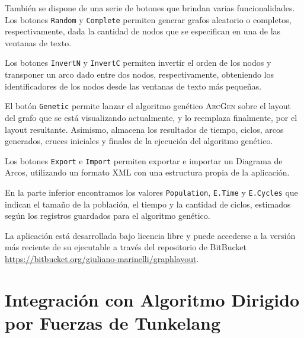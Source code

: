 	
	
	También se dispone de una serie de botones que brindan varias funcionalidades. Los botones \texttt{Random} y \texttt{Complete} permiten generar grafos aleatorio o completos, respectivamente, dada la cantidad de nodos que se especifican en una de las ventanas de texto. 
	
	Los botones \texttt{InvertN} y \texttt{InvertC} permiten invertir el orden de los nodos y transponer un arco dado entre dos nodos, respectivamente, obteniendo los identificadores de los nodos desde las ventanas de texto más pequeñas. 
	
	
	El botón \texttt{Genetic} permite lanzar el algoritmo genético \textsc{\textsc{ArcGen}} sobre el layout del grafo que se está visualizando actualmente, y lo reemplaza finalmente, por el layout resultante. Asimismo,  almacena los resultados de tiempo, ciclos, arcos generados, cruces iniciales y finales de la ejecución del algoritmo genético.
	
	Los botones \texttt{Export} e \texttt{Import} permiten exportar e importar un Diagrama de Arcos, utilizando un formato XML con una estructura propia de la aplicación.
	
	En la parte inferior encontramos los valores \texttt{Population}, \texttt{E.Time} y \texttt{E.Cycles} que indican el tamaño de la población, el tiempo y la cantidad de ciclos, estimados según los registros guardados para el algoritmo genético.	
	
	
	La aplicación está  desarrollada bajo licencia libre y puede accederse a la versión más reciente de su ejecutable a través del repositorio de BitBucket  \url{https://bitbucket.org/giuliano-marinelli/graphlayout}.

\section{Integración con Algoritmo Dirigido por Fuerzas de Tunkelang}
